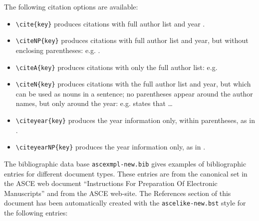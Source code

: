 \documentclass[Journal,letterpaper]{ascelike-new}
\begin{document}
The following citation options are available:
\begin{itemize}
\item
\verb+\cite{key}+ produces citations with full author 
list and year \cite{Ireland:1954a}.
\item
\verb+\citeNP{key}+ produces citations with full author list and year, 
but without enclosing parentheses: e.g. .
\item
\verb+\citeA{key}+ produces citations with only the full 
author list: e.g. 
\item
\verb+\citeN{key}+ produces citations with the full author list and year, but
which can be used as nouns in a sentence; no parentheses appear around
the author names, but only around the year: e.g. 
states that \ldots
\item
\verb+\citeyear{key}+ produces the year information only, within parentheses,
as in \citeyear{Ireland:1954a}.
\item
\verb+\citeyearNP{key}+ produces the year information only,
as in .
\end{itemize}
%
\par
The bibliographic data base \texttt{ascexmpl-new.bib}
gives examples of bibliographic entries for different document types.
These entries are from the canonical set in the
ASCE web document ``Instructions For Preparation Of Electronic Manuscripts''
and from the ASCE web-site.
The References section of this document has been automatically created with
the \texttt{ascelike-new.bst} style for the following entries:
\end{document}
